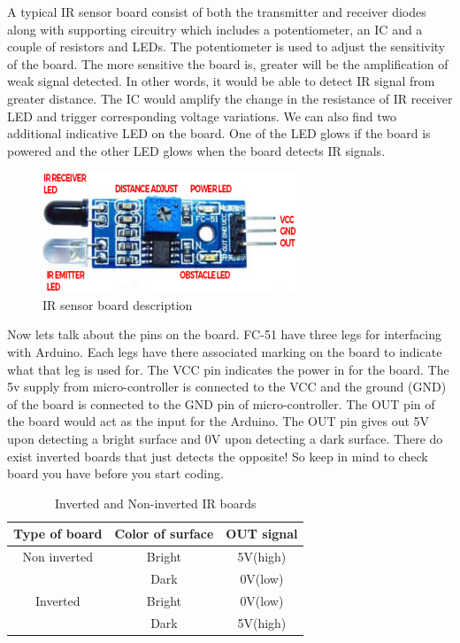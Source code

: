 \par A typical \ac{IR} sensor board consist of both the transmitter and receiver diodes along with supporting circuitry which includes a potentiometer, an \ac{IC} and a couple of resistors and LEDs. The potentiometer is used to adjust the sensitivity of the board. The more sensitive the board is, greater will be the amplification of weak signal detected. In other words, it would be able to detect \ac{IR} signal from greater distance. The \ac{IC} would amplify the change in the resistance of \ac{IR} receiver LED and trigger corresponding voltage variations. We can also find two additional indicative LED on the board. One of the LED glows if the board is powered and the other LED glows when the board detects \ac{IR} signals.

\begin{figure}[h!]	
	\centering
	\includegraphics[width=3in]{Images/IR Sensor/IR_board_desp.png}
	\caption{\ac{IR} sensor board description}
\end{figure}

 Now lets talk about the pins on the board. FC-51 have three legs for interfacing with Arduino. Each legs have there associated marking on the board to indicate what that leg is used for. The VCC pin indicates the power in for the board. The 5v supply from micro-controller is connected to the VCC and the ground (GND) of the board is connected to the GND pin of micro-controller. The OUT pin of the board would act as the input for the Arduino. The OUT pin gives out 5V upon detecting a bright surface and 0V upon detecting a dark surface. There do exist inverted boards that just detects the opposite! So keep in mind to check board you have before you start coding. 

\begin{table}
    \centering
    \begin{tabular}{|c|c|c|}
    \hline
    \textbf{\hspace{0.4cm}Type of board\hspace{0.4cm}} & \textbf{\hspace{0.4cm} Color of surface\hspace{0.4cm} }& \textbf{\hspace{0.4cm}OUT signal\hspace{0.4cm}} \\
    \hline
    \centering Non inverted & Bright & 5V(high) \\ \cline{2-3} & Dark & 0V(low) \\
    \hline
    \centering Inverted & Bright & 0V(low) \\ \cline{2-3} & Dark & 5V(high) \\
    \hline
    \end{tabular}
    \caption{Inverted and Non-inverted IR boards}
\end{table}

